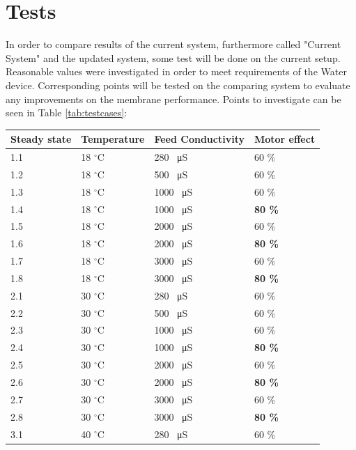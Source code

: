 \section{Tests}
In order to compare results of the current system, furthermore called "Current System" and the updated system, some test will be done on the current setup. Reasonable values were investigated in order to meet requirements of the Water device. Corresponding points will be tested on the comparing system to evaluate any improvements on the membrane performance. Points to investigate can be seen in Table \ref{tab:testcases}:\\
\begin{table}[h]
\begin{tabular}{|p{1.4cm}||p{2cm}|p{3.2cm}|p{1.8cm}|}
 \hline
 \textbf{Steady state }&Temperature&Feed Conductivity&Motor effect \\
 \hline
 1.1 & 18 $^\circ$C   & 280 \SI{}{\micro\siemens} & 60 \% \\
 1.2   &  18 $^\circ$C   & 500 \SI{}{\micro\siemens} & 60 \% \\
 1.3 &  18 $^\circ$C  &1000 \SI{}{\micro\siemens} & 60 \% \\
 1.4 &  18 $^\circ$C  &1000 \SI{}{\micro\siemens} & \textbf{80 \%} \\
 1.5 &18 $^\circ$C &2000 \SI{}{\micro\siemens}& 60 \%\\
 1.6 &18 $^\circ$C  &2000 \SI{}{\micro\siemens}& \textbf{80 \%}\\
 1.7   &18 $^\circ$C & 3000 \SI{}{\micro\siemens}&60 \% \\
 1.8   &18 $^\circ$C&3000 \SI{}{\micro\siemens}& \textbf{80 \%}\\
 \hline
 2.1 & 30 $^\circ$C & 280 \SI{}{\micro\siemens}&60 \%\\
 2.2 & 30 $^\circ$C &500 \SI{}{\micro\siemens}& 60 \%\\
 2.3 & 30 $^\circ$C&1000 \SI{}{\micro\siemens}& 60 \%\\
 2.4 & 30 $^\circ$C&1000 \SI{}{\micro\siemens}& \textbf{80 \%}\\
 2.5 & 30 $^\circ$C&2000 \SI{}{\micro\siemens}& 60 \%\\
 2.6 & 30 $^\circ$C&2000 \SI{}{\micro\siemens}& \textbf{80 \%}\\
 2.7 & 30 $^\circ$C& 3000 \SI{}{\micro\siemens}&60 \%\\
 2.8 & 30 $^\circ$C& 3000 \SI{}{\micro\siemens}&\textbf{80 \%}\\
 \hline 
 3.1 & 40 $^\circ$C& 280 \SI{}{\micro\siemens}& 60 \%\\

\end{tabular}
\end{table}
